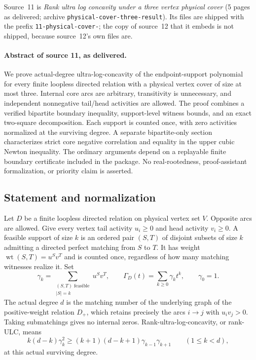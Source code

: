\documentclass[11pt]{article}
\numberwithin{equation}{section}
\theoremstyle{definition}\newtheorem{definition}[theorem]{Definition}\newtheorem{remark}[theorem]{Remark}
\newcommand{\Ga}{\Gamma}                   %
\newcommand{\wt}{\operatorname{wt}}        %
\begin{document}
Source~11 is \emph{Rank ultra log concavity under a three vertex physical
cover} (5 pages as delivered; archive \texttt{physical-cover-three-result}).
Its files are shipped with the prefix \texttt{11-physical-cover-}; the copy
of source~12 that it embeds is not shipped, because source~12's own files
are.

\paragraph{Abstract of source 11, as delivered.}

We prove actual-degree ultra-log-concavity of the endpoint-support polynomial
for every finite loopless directed relation with a physical vertex cover of
size at most three. Internal core arcs are arbitrary, transitivity is
unnecessary, and independent nonnegative tail/head activities are allowed.
The proof combines a verified bipartite boundary inequality, support-level
witness bounds, and an exact two-square decomposition. Each support is
counted once, with zero activities normalized at the surviving degree.
A separate bipartite-only section characterizes strict core negative
correlation and equality in the upper cubic Newton inequality. The ordinary
arguments depend on a replayable finite boundary certificate included in the
package. No real-rootedness, proof-assistant formalization, or priority claim
is asserted.

\subsection{Statement and normalization}
Let $D$ be a finite loopless directed relation on physical vertex set $V$.
Opposite arcs are allowed. Give every vertex tail activity $u_i\ge0$ and
head activity $v_i\ge0$.
A feasible support of size $k$ is an ordered pair $(S,T)$ of disjoint subsets
of size $k$ admitting a directed perfect matching from $S$ to $T$. It has
weight $\wt(S,T)=u^Sv^T$ and is counted once, regardless of how many matching
witnesses realize it. Set
\[
 \gamma_k=\sum_{\substack{(S,T)\text{ feasible}\\|S|=k}}u^Sv^T,
 \qquad \Ga_D(t)=\sum_{k\ge0}\gamma_k t^k,
 \qquad\gamma_0=1.
\]
The actual degree $d$ is the matching number of the underlying graph of the
positive-weight relation $D_+$, which retains precisely the arcs
$i\to j$ with $u_iv_j>0$. Taking submatchings gives no internal zeros.
Rank-ultra-log-concavity, or rank-ULC, means
\begin{equation}\label{pgr:r:pc:eq:rankulc}
 k(d-k)\gamma_k^2\ge(k+1)(d-k+1)\gamma_{k-1}\gamma_{k+1}
 \qquad(1\le k<d),
\end{equation}
at this actual surviving degree.
\end{document}
